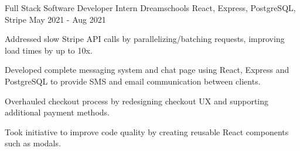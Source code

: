 \begin{cventries}

  \cventry
    {Full Stack Software Developer Intern} %
    {Dreamschools} %
    {React, Express, PostgreSQL, Stripe} %
    {May 2021 - Aug 2021} %
    {
      \begin{cvitems} %
        \item {Addressed slow {Stripe} API calls by parallelizing/batching requests, improving load times by up to 10x.}
        \item {Developed complete messaging system and chat page using {React}, {Express} and {PostgreSQL} to provide SMS and email communication between clients.}
        \item {Overhauled checkout process by redesigning checkout UX and supporting additional payment methods.}
        \item {Took initiative to improve code quality by creating reusable React components such as modals.}
      \end{cvitems}
    }
\end{cventries}
